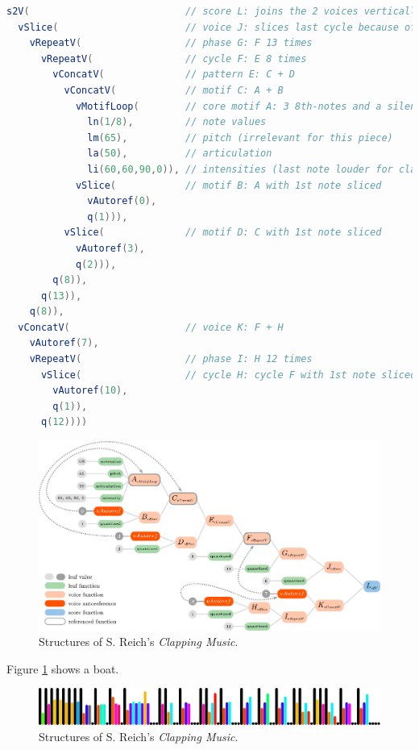 \documentclass{article}
\begin{document}
\begin{lstlisting}[language=Java, caption=A possible decoded genotype for S. Reich's \emph{Clapping Music}]
s2V(                           // score L: joins the 2 voices vertically
  vSlice(                      // voice J: slices last cycle because of phase lag
    vRepeatV(                  // phase G: F 13 times
      vRepeatV(                // cycle F: E 8 times 
        vConcatV(              // pattern E: C + D
          vConcatV(            // motif C: A + B
            vMotifLoop(        // core motif A: 3 8th-notes and a silence
              ln(1/8),         // note values
              lm(65),          // pitch (irrelevant for this piece)
              la(50),          // articulation
              li(60,60,90,0)), // intensities (last note louder for clarity) 
            vSlice(            // motif B: A with 1st note sliced
              vAutoref(0),
              q(1))),
          vSlice(              // motif D: C with 1st note sliced
            vAutoref(3),
            q(2))),
        q(8)),
      q(13)),
    q(8)),
  vConcatV(                    // voice K: F + H
    vAutoref(7),
    vRepeatV(                  // phase I: H 12 times 
      vSlice(                  // cycle H: cycle F with 1st note sliced
        vAutoref(10),
        q(1)),
      q(12))))
\end{lstlisting}


\begin{figure}
  \includegraphics[width=\linewidth]{figs/clapping_tree_graph_colours_code.pdf}
  \caption{Structures of S. Reich's \emph{Clapping Music}.}
  \label{fig:boat2}
\end{figure}

Figure \ref{fig:boat2} shows a boat.


\begin{figure}
\begin{center}
  \includegraphics[width=13cm]{figs/clappingVisualized.pdf}
\end{center}  
  \caption{Structures of S. Reich's \emph{Clapping Music}.}
  \label{fig:boat3}
\end{figure}
\end{document}
